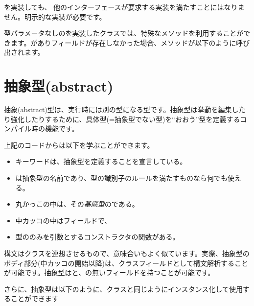 
を実装しても、 他のインターフェースが要求する実装を満たすことにはなりません。明示的な実装が必要です。

型パラメータなしのを実装したクラスでは、特殊なメソッドを利用することができます。がありフィールドが存在しなかった場合、メソッドが以下のように呼び出されます。




\section{抽象型(abstract)}
\label{types-abstract}

抽象(abstract)型は、実行時には別の型になる型です。抽象型は挙動を編集したり強化したりするために、具体型(=抽象型でない型)を``おおう''型を定義するコンパイル時の機能です。


上記のコードからは以下を学ぶことができます。

\begin{itemize}
	\item {}キーワードは、抽象型を定義することを宣言している。
	\item {}は抽象型の名前であり、型の識別子のルールを満たすものなら何でも使える。
	\item 丸かっこ\expr{()}の中は、その\emph{基底型}のである。
	\item 中カッコ\expr{$\left\{\right\}$}の中はフィールドで、
	\item {}型ののみを引数とするコンストラクタの関数がある。
\end{itemize}


構文はクラスを連想させるもので、意味合いもよく似ています。実際、抽象型のボディ部分(中カッコの開始以降)は、クラスフィールドとして構文解析することが可能です。抽象型はと、の無いフィールドを持つことが可能です。

さらに、抽象型は以下のように、クラスと同じようにインスタンス化して使用することができます

